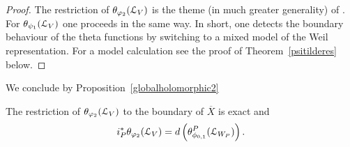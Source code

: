\begin{proof}
The restriction of $\theta_{\varphi_2}(\mathcal{L}_V)$ is the theme (in much greater generality) of \cite{FMres}. For $\theta_{\psi_1}(\mathcal{L}_V)$ one proceeds in the same way. In short, one detects the boundary behaviour of the theta functions by switching to a mixed model of the Weil representation. For a model calculation see the proof of Theorem~\ref{psitilderes} below. 
 \begin{comment}
 We assume for simplicity that $L = \Z u + L_W + \Z u'$ and that $h=0$. We first note that it suffices to consider the limit $t \to \infty$ for $z=z(t,0,0)$.  We have for the Gaussian $\varphi_0(x,z) = \exp\left(-\pi[ t^{-2}y_1^2+ 2q(x')+t^2y_1'^2]\right)$ with $x = y_1u+x'+y_1'u' \in V$, where $x' \in W$. Hence when taking the limit $t \to \infty$ all components of $\theta(\tau,\psi_1^V,\calL_V)$ vanish unless $y'=0$. We can also ignore the summation over $L_W$ for the moment, since it is unaffected by $t$. One then applies Poisson summation on the sum over $y_1$ to apply the result. 
Hence it suffices to consider for fixed $x' \in W$ the sum
\begin{align*} 
\sum_{k \in \Z} \psi(ku+x',z(t,s,w)) & = 
\sum_{k \in \Z} -\frac12t^{-1}k(x,x(s)) \exp\left(-\pi[ t^{-2}k^2+ 2q(x')]\right) \frac{dt}{t}  \\
& + \sum_{k \in \Z} \frac12t^{-2}k^2\exp\left(-\pi[ t^{-2}k^2+ 2q(x')]\right)  \frac{1}{\sqrt{2}} \frac{dw_3}{ts?} \\
&+ \sum_{k \in \Z} -(x,x'(s))(x,x(s)) \exp\left(-\pi[ t^{-2}k^2+ 2q(x')]\right)  \frac{1}{\sqrt{2}} \frac{dw_2}{ts?} \\
& + \sum_{k \in \Z} -\frac12t^{-1}k(x,x'(s) \exp\left(-\pi[ t^{-2}k^2+ 2q(x')]\right) {ds}.
\end{align*}
Applying Poisson summation then yields
\begin{align*} 
\sum_{k \in \Z} \psi(ku+x',z(t,s,w)) & = 
\sum_{k \in \Z} -\frac12tk(x,x(s)) \exp\left(-\pi[ t^{2}k^2+ 2q(x')]\right) {dt}  \\
& + \sum_{k \in \Z} \frac12(2t^{2}k^2-\frac1{\pi}) \exp\left(-\pi[ t^{2}k^2+ 2q(x')]\right)  \frac{1}{\sqrt{2}} \frac{dw_3}{s?} \\
&+ \sum_{k \in \Z} -(x,x'(s))(x,x(s)) \exp\left(-\pi[ t^{2}k^2+ 2q(x')]\right)  \frac{1}{\sqrt{2}} \frac{dw_2}{s?} \\
& + \sum_{k \in \Z} -\frac12t^2k(x,x'(s)) \exp\left(-\pi[ t^{2}k^2+ 2q(x')]\right) {ds}.
\end{align*}
Now taking the limit $t \to \infty$ gives the claim. {\bf CHECK THE SIGN!}
\end{comment}
\end{proof}

We conclude by Proposition~\ref{globalholomorphic2}

\begin{theorem}\label{globalexact}

The restriction of $\theta_{\varphi_2}(\mathcal{L}_V)$ to the boundary of $\overline{X}$ is exact and
\[
i_P^{\ast} \theta_{\varphi_2}( \mathcal{L}_V) = d\left(  \theta^P_{\phi_{0,1}}(\mathcal{L}_{W_P}) \right). 
\]
\end{theorem}

